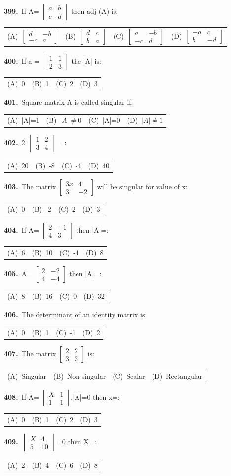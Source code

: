 \documentclass[11pt,a4paper]{article}
\makeatletter
\newcommand{\mcq}[6]{%
  \Needspace{4\baselineskip}%
  \par\medskip\noindent\textbf{#1.}\ #2\par\nopagebreak
  \noindent\begin{tabularx}{\linewidth}{@{\hspace{1.5em}}*{4}{>{\raggedright\arraybackslash}X}@{}}
    (A)~#3 & (B)~#4 & (C)~#5 & (D)~#6
  \end{tabularx}\par}
\makeatother
\begin{document}
\mcq{399}{If A= $\begin{bmatrix}a&b\\c&d\end{bmatrix}$ then adj (A) is:}{$\begin{bmatrix}d&-b\\-c&a\end{bmatrix}$}{$\begin{bmatrix}d&c\\b&a\end{bmatrix}$}{$\begin{bmatrix}a&-b\\-c&d\end{bmatrix}$}{$\begin{bmatrix}-a&c\\b&-d\end{bmatrix}$}
\mcq{400}{If a = $\begin{bmatrix}1&1\\2&3\end{bmatrix}$ the |A| is:}{0}{1}{2}{3}
\mcq{401}{Square matrix A is called singular if:}{|A|=1}{$|A|\neq0$}{|A|=0}{$|A|\neq1$}
\mcq{402}{2 $\begin{vmatrix}1&2\\3&4\end{vmatrix}$ =:}{20}{-8}{-4}{40}
\mcq{403}{The matrix $\begin{bmatrix}3x&4\\3&-2\end{bmatrix}$ will be singular for value of x:}{0}{-2}{2}{3}
\mcq{404}{If A= $\begin{bmatrix}2&-1\\4&3\end{bmatrix}$ then |A|=:}{6}{10}{-4}{8}
\mcq{405}{A= $\begin{bmatrix}2&-2\\4&-4\end{bmatrix}$ then |A|=:}{8}{16}{0}{32}
\mcq{406}{The determinant of an identity matrix is:}{0}{1}{-1}{2}
\mcq{407}{The matrix $\begin{bmatrix}2&2\\3&3\end{bmatrix}$ is:}{Singular}{Non-singular}{Scalar}{Rectangular}
\mcq{408}{If A= $\begin{bmatrix}X&1\\1&1\end{bmatrix}$,|A|=0 then x=:}{0}{1}{2}{3}
\mcq{409}{$\begin{vmatrix}X&4\\5&10\end{vmatrix}$=0 then X=:}{2}{4}{6}{8}
\end{document}
